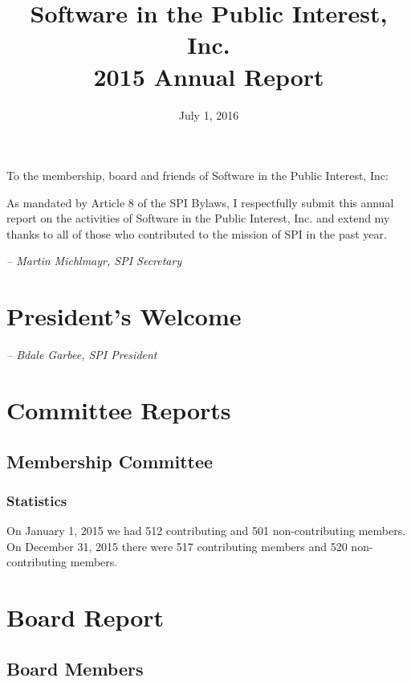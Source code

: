 \documentclass[letterpaper]{report}
\begin{document}
\title{Software in the Public Interest, Inc.\\
2015 Annual Report}
\date{July 1, 2016}

\maketitle

To the membership, board and friends of Software in the Public Interest, Inc:

As mandated by Article 8 of the SPI Bylaws, I respectfully submit this annual
report on the activities of Software in the Public Interest, Inc. and extend my
thanks to all of those who contributed to the mission of SPI in the past year.

  \emph{-- Martin Michlmayr, SPI Secretary}

\newpage

\tableofcontents

\newpage

\chapter{President's Welcome}
\label{sec:president}

  \emph{-- Bdale Garbee, SPI President}

\chapter{Committee Reports}
\section{Membership Committee}

\subsection{Statistics}

On January 1, 2015 we had 512 contributing and 501 non-contributing members.
On December 31, 2015 there were 517 contributing members and 520 non-contributing
members.


\chapter{Board Report}
\section{Board Members}
\end{document}
